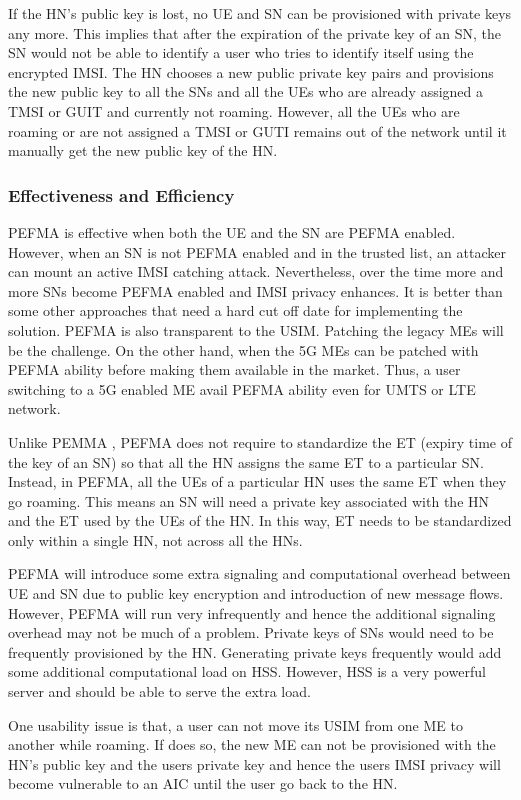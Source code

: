 \documentclass{river-journal}
\begin{document}
If the HN's public key is lost, no UE and SN can be provisioned with private keys any more. This implies that after the expiration of the private key of an SN, the SN would not be able to identify a user who tries to identify itself using the encrypted IMSI. The HN chooses a new public private key pairs and provisions the new public key to all the SNs and all the UEs who are already assigned a TMSI or GUIT and currently not roaming. However, all the UEs who are roaming or are not assigned a TMSI or GUTI remains out of the network until it manually get the new public key of the HN.

\subsubsection{Effectiveness and Efficiency}
PEFMA is effective when both the UE and the SN are PEFMA enabled. However, when an SN is not PEFMA enabled and in the trusted list, an attacker can mount an active IMSI catching attack. Nevertheless, over the time more and more SNs become PEFMA enabled and IMSI privacy enhances. It is better than some other approaches that need a hard cut off date for implementing the solution. PEFMA is also transparent to the USIM.  
Patching the legacy MEs will be the challenge. On the other hand, when the 5G MEs can be patched with PEFMA ability before making them available in the market. Thus, a user switching to a 5G enabled ME avail PEFMA ability even for UMTS or LTE network. 

Unlike PEMMA \cite{koienibe}, PEFMA does not require to standardize the ET (expiry time of the key of an SN) so that all the HN assigns the same ET to a particular SN. Instead, in PEFMA, all the UEs of a particular HN uses the same ET when they go roaming. This means an SN will need a private key associated with the HN and the ET used by the UEs of the HN. In this way, ET needs to be standardized only within a single HN, not across all the HNs.

PEFMA will introduce some extra signaling and computational overhead between UE and SN due to public key encryption and introduction of new message flows. However, PEFMA will run very infrequently and hence the additional signaling overhead may not be much of a problem. Private keys of SNs would need to be frequently provisioned by the HN. Generating private keys frequently would add some additional computational load on HSS. However, HSS is a very powerful server and should be able to serve the extra load.

One usability issue is that, a user can not move its USIM from one ME to another while roaming. If does so, the new ME can not be provisioned with the HN's public key and the users private key and hence the users IMSI privacy will become vulnerable to an AIC until the user go back to the HN.
\end{document}
